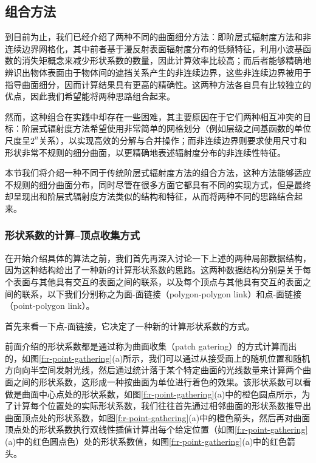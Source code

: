 \subsection{组合方法}\label{sec:r-combine}
到目前为止，我们已经介绍了两种不同的曲面细分方法：即阶层式辐射度方法和非连续边界网格化，其中前者基于漫反射表面辐射度分布的低频特征，利用小波基函数的消失矩概念来减少形状系数的数量，因此计算效率比较高；而后者能够精确地辨识出物体表面由于物体间的遮挡关系产生的非连续边界，这些非连续边界被用于指导曲面细分，因而计算结果具有更高的精确性。这两种方法各自具有比较独立的优点，因此我们希望能将两种思路组合起来。

然而，这种组合在实践中却存在一些困难，其主要原因在于它们两种相互冲突的目标：阶层式辐射度方法希望使用非常简单的网格划分（例如层级之间基函数的单位尺度呈$2^{n}$关系），以实现高效的分解与合并操作；而非连续边界则要求使用尺寸和形状非常不规则的细分曲面，以更精确地表述辐射度分布的非连续性特征。

本节我们将介绍一种不同于传统阶层式辐射度方法的组合方法，这种方法能够适应不规则的细分曲面分布，同时尽管在很多方面它都具有不同的实现方式，但是最终却呈现出和阶层式辐射度方法类似的结构和特征，从而将两种不同的思路结合起来。




\subsubsection{形状系数的计算--顶点收集方式}
在开始介绍具体的算法之前，我们首先再深入讨论一下上述的两种局部数据结构，因为这种结构给出了一种新的计算形状系数的思路。这两种数据结构分别是关于每个表面与其他具有交互的表面之间的联系，以及每个顶点与其他具有交互的表面之间的联系，以下我们分别称之为面-面链接（polygon-polygon link）和点-面链接（point-polygon link）。

首先来看一下点-面链接，它决定了一种新的计算形状系数的方式。

前面介绍的形状系数都是通过称为曲面收集（patch gatering）的方式计算而出的，如图\ref{f:r-point-gathering}(a)所示，我们可以通过从接受面上的随机位置和随机方向向半空间发射光线，然后通过统计落于某个特定曲面的光线数量来计算两个曲面之间的形状系数，这形成一种按曲面为单位进行着色的效果。该形状系数可以看做是曲面中心点处的形状系数，如图\ref{f:r-point-gathering}(a)中的橙色圆点所示，为了计算每个位置处的实际形状系数，我们往往首先通过相邻曲面的形状系数推导出曲面顶点处的形状系数，如图\ref{f:r-point-gathering}(a)中的橙色箭头，然后再对曲面顶点处的形状系数执行双线性插值计算出每个给定位置（如图\ref{f:r-point-gathering}(a)中的红色圆点色）处的形状系数值，如图\ref{f:r-point-gathering}(a)中的红色箭头。


